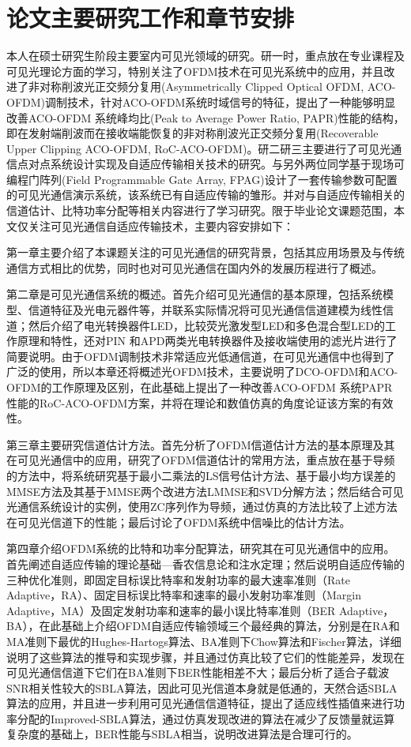\section{论文主要研究工作和章节安排}\label{sec:concept}
本人在硕士研究生阶段主要室内可见光领域的研究。研一时，重点放在专业课程及可见光理论方面的学习，特别关注了OFDM技术在可见光系统中的应用，并且改进了非对称削波光正交频分复用(Asymmetrically Clipped Optical OFDM, ACO-OFDM)调制技术，针对ACO-OFDM系统时域信号的特征，提出了一种能够明显改善ACO-OFDM 系统峰均比(Peak to Average Power Ratio, PAPR)性能的结构，即在发射端削波而在接收端能恢复的非对称削波光正交频分复用(Recoverable Upper Clipping ACO-OFDM, RoC-ACO-OFDM)\cite{xu2014aco}。研二研三主要进行了可见光通信点对点系统设计实现及自适应传输相关技术的研究。与另外两位同学基于现场可编程门阵列(Field Programmable Gate Array, FPAG)设计了一套传输参数可配置的可见光通信演示系统，该系统已有自适应传输的雏形。并对与自适应传输相关的信道估计、比特功率分配等相关内容进行了学习研究。限于毕业论文课题范围，本文仅关注可见光通信自适应传输技术，主要内容安排如下：

第一章主要介绍了本课题关注的可见光通信的研究背景，包括其应用场景及与传统通信方式相比的优势，同时也对可见光通信在国内外的发展历程进行了概述。

第二章是可见光通信系统的概述。首先介绍可见光通信的基本原理，包括系统模型、信道特征及光电元器件等，并联系实际情况将可见光通信信道建模为线性信道；然后介绍了电光转换器件LED，比较荧光激发型LED和多色混合型LED的工作原理和特性，还对PIN 和APD两类光电转换器件及接收端使用的滤光片进行了简要说明。由于OFDM调制技术非常适应光低通信道，在可见光通信中也得到了广泛的使用，所以本章还将概述光OFDM技术，主要说明了DCO-OFDM和ACO-OFDM的工作原理及区别，在此基础上提出了一种改善ACO-OFDM 系统PAPR 性能的RoC-ACO-OFDM方案，并将在理论和数值仿真的角度论证该方案的有效性。

第三章主要研究信道估计方法。首先分析了OFDM信道估计方法的基本原理及其在可见光通信中的应用，研究了OFDM信道估计的常用方法，重点放在基于导频的方法中，将系统研究基于最小二乘法的LS信号估计方法、基于最小均方误差的MMSE方法及其基于MMSE两个改进方法LMMSE和SVD分解方法；然后结合可见光通信系统设计的实例，使用ZC序列作为导频，通过仿真的方法比较了上述方法在可见光信道下的性能；最后讨论了OFDM系统中信噪比的估计方法。

第四章介绍OFDM系统的比特和功率分配算法，研究其在可见光通信中的应用。首先阐述自适应传输的理论基础—香农信息论和注水定理；然后说明自适应传输的三种优化准则，即固定目标误比特率和发射功率的最大速率准则（Rate Adaptive，RA）、固定目标误比特率和速率的最小发射功率准则（Margin Adaptive，MA）及固定发射功率和速率的最小误比特率准则（BER Adaptive，BA），在此基础上介绍OFDM自适应传输领域三个最经典的算法，分别是在RA和MA准则下最优的Hughes-Hartogs算法、BA准则下Chow算法和Fischer算法，详细说明了这些算法的推导和实现步骤，并且通过仿真比较了它们的性能差异，发现在可见光通信信道下它们在BA准则下BER性能相差不大；最后分析了适合子载波SNR相关性较大的SBLA算法，因此可见光信道本身就是低通的，天然合适SBLA算法的应用，并且进一步利用可见光通信信道特征，提出了适应线性插值来进行功率分配的Improved-SBLA算法，通过仿真发现改进的算法在减少了反馈量就运算复杂度的基础上，BER性能与SBLA相当，说明改进算法是合理可行的。